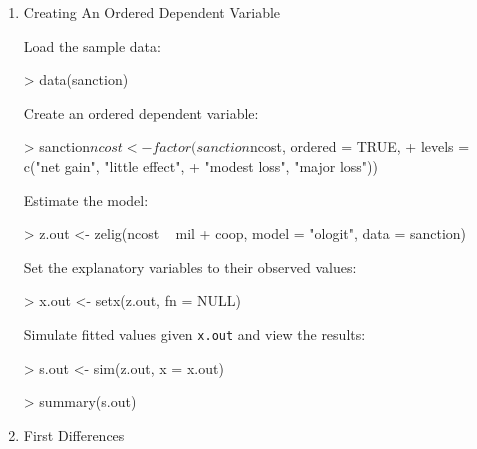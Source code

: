 \documentclass{article}
\begin{document}
\begin{enumerate}

\item {Creating An Ordered Dependent Variable} \label{ord.fact}

Load the sample data:  
\begin{Schunk}
\begin{Sinput}
>  data(sanction)
\end{Sinput}
\end{Schunk}
Create an ordered dependent variable: 
\begin{Schunk}
\begin{Sinput}
>  sanction$ncost <- factor(sanction$ncost, ordered = TRUE,
+                           levels = c("net gain", "little effect", 
+                           "modest loss", "major loss"))
\end{Sinput}
\end{Schunk}
Estimate the model:
\begin{Schunk}
\begin{Sinput}
>  z.out <- zelig(ncost ~ mil + coop, model = "ologit", data = sanction)
\end{Sinput}
\end{Schunk}
Set the explanatory variables to their observed values:  
\begin{Schunk}
\begin{Sinput}
>  x.out <- setx(z.out, fn = NULL)
\end{Sinput}
\end{Schunk}
Simulate fitted values given {\tt x.out} and view the results:
\begin{Schunk}
\begin{Sinput}
>  s.out <- sim(z.out, x = x.out)
\end{Sinput}
\end{Schunk}
\begin{Schunk}
\begin{Sinput}
>  summary(s.out)
\end{Sinput}
\end{Schunk}

\item {First Differences}


\end{enumerate}
\end{document}

